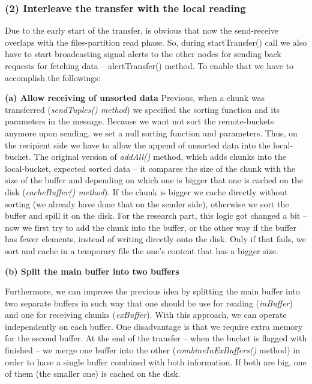 % 
\subsubsection*{(2) Interleave the transfer with the local reading}

Due to the early start of the transfer, is obvious that now the send-receive overlaps with the files-partition read phase. So, during startTransfer() call we also have to start broadcasting signal alerts to the other nodes for sending back requests for fetching data -- alertTransfer() method. To enable that we have to accomplish the followings:

\textbf{(a) Allow receiving of unsorted data}
Previous, when a chunk was transferred (\textit{sendTuples() method}) we specified the sorting function and its parameters in the message. Because we want not sort the remote-buckets anymore upon sending, we set a null sorting function and parameters. Thus, on the recipient side we have to allow the append of unsorted data into the local-bucket. The original version of \textit{addAll()} method, which adds chunks into the local-bucket, expected sorted data -- it compares the size of the chunk with the size of the buffer and depending on which one is bigger that one is cached on the disk (\textit{cacheBuffer() method}). If the chunk is bigger we cache directly without sorting (we already have done that on the sender side), otherwise we sort the buffer and spill it on the disk. For the research part, this logic got changed a bit -- now we first try to add the chunk into the buffer, or the other way if the buffer has fewer elements, instead of writing directly onto the disk. Only if that fails, we sort and cache in a temporary file the one's content that has a bigger size. 

\textbf{(b) Split the main buffer into two buffers}

Furthermore, we can improve the previous idea by splitting the main buffer into two separate buffers in such way that one should be use for reading (\textit{inBuffer}) and one for receiving chunks (\textit{exBuffer}). With this approach, we can operate independently on each buffer. One disadvantage is that we require extra memory for the second buffer. At the end of the transfer -- when the bucket is flagged with finished -- we merge one buffer into the other (\textit{combineInExBuffers()} method) in order to have a single buffer combined with both information. If both are big, one of them (the smaller one) is cached on the disk.


